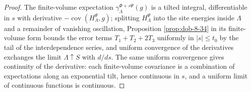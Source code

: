 \begin{proof}
    \leanok
    The finite-volume expectation $\gamma_\Lambda^{\Phi+s\Psi}(g)$ is a tilted integral,
    differentiable in $s$ with derivative $-\operatorname{cov}(H^\Psi_\Lambda, g)$; splitting
    $H^\Psi_\Lambda$ into the site energies inside $\Lambda$ and a remainder of vanishing
    oscillation, Proposition \ref{prop:dob-8-34} in its finite-volume form bounds the error terms
    $T_1 + T_2 + 2T_3$ uniformly in $|s| \leq t_0$ by the tail of the interdependence series, and
    uniform convergence of the derivatives exchanges the limit $\Lambda \uparrow S$ with
    $d/ds$. The same uniform convergence gives continuity of the derivative: each finite-volume
    covariance is a combination of expectations along an exponential tilt, hence continuous in
    $s$, and a uniform limit of continuous functions is continuous.
\end{proof}
